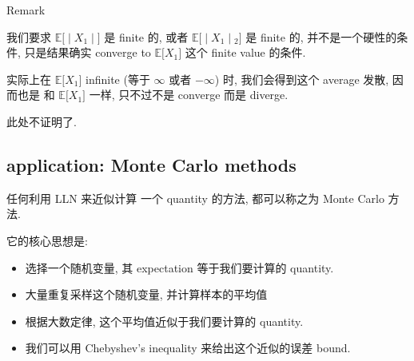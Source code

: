 \documentclass{qlnotes-export}
\begin{document}
\begin{qlremark}{Remark}

我们要求 \(\left. {\mathbb{E}}\lbrack \middle| X_{1} \middle| \rbrack \right.\) 是 finite 的, 或者 \(\left. {\mathbb{E}}\lbrack \middle| X_{1} \middle| {}_{2}\rbrack \right.\) 是 finite 的, 并不是一个硬性的条件, 只是结果确实 converge to \({\mathbb{E}}\lbrack X_{1}\rbrack\) 这个 finite value 的条件.

实际上在 \({\mathbb{E}}\lbrack X_{1}\rbrack\) infinite (等于 \(\infty\) 或者 \(- \infty\)) 时, 我们会得到这个 average 发散, 因而也是 和 \({\mathbb{E}}\lbrack X_{1}\rbrack\) 一样, 只不过不是 converge 而是 diverge.

此处不证明了.

\end{qlremark}

\subsection{application: Monte Carlo methods}\label{application-monte-carlo-methods}

任何利用 LLN 来近似计算 一个 quantity 的方法, 都可以称之为 Monte Carlo 方法.

它的核心思想是:

\begin{itemize}
\item
  选择一个随机变量, 其 expectation 等于我们要计算的 quantity.
\item
  大量重复采样这个随机变量, 并计算样本的平均值
\item
  根据大数定律, 这个平均值近似于我们要计算的 quantity.
\item
  我们可以用 Chebyshev's inequality 来给出这个近似的误差 bound.
\end{itemize}
\end{document}
